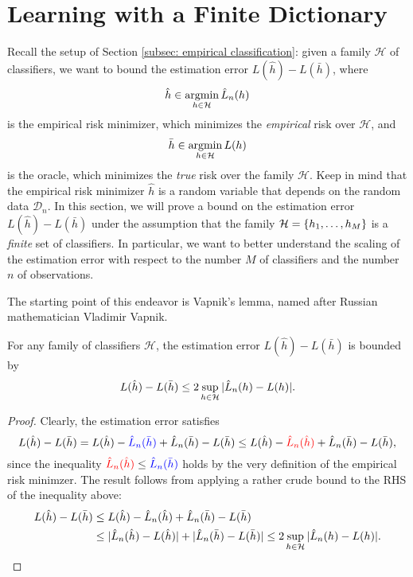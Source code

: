 \section{Learning with a Finite Dictionary}
\label{sec: learning with a finite dictionary}

Recall the setup of Section \ref{subsec: empirical classification}: given a family $\mathcal{H}$ of classifiers, we want to bound the estimation error $L(\hat{h}) - L(\bar{h})$, where
\[
    \hat{h} \in \operatorname*{argmin}_{h \in \mathcal{H}} \hat{L}_n(h)
\]
is the empirical risk minimizer, which minimizes the \emph{empirical} risk over $\mathcal{H}$, and
\[
    \bar{h} \in \operatorname*{argmin}_{h \in \mathcal{H}} L(h)
\]
is the oracle, which minimizes the \emph{true} risk over the family $\mathcal{H}$. Keep in mind that the empirical risk minimizer $\hat{h}$ is a random variable that depends on the random data $\mathcal{D}_n$. In this section, we will prove a bound on the estimation error $L(\hat{h}) - L(\bar{h})$ under the assumption that the family $\mathcal{H} = \set{h_1, \dots, h_M}$ is a \emph{finite} set of classifiers. In particular, we want to better understand the scaling of the estimation error with respect to the number $M$ of classifiers and the number $n$ of observations.

The starting point of this endeavor is Vapnik's lemma, named after Russian mathematician Vladimir Vapnik.

\begin{lemma}
\label{lem: bound on estimation error}
For any family of classifiers $\mathcal{H}$, the estimation error $L(\hat{h}) - L(\bar{h})$ is bounded by
\[
    L(\hat{h}) - L(\bar{h}) \leq 2 \sup_{h \in \mathcal{H}} \abs*{\hat{L}_n(h) - L(h)}.
\]
\end{lemma}

\begin{proof}
Clearly, the estimation error satisfies
\[
    L(\hat{h}) - L(\bar{h}) = L(\hat{h}) - {\color{blue} \hat{L}_n(\bar{h})} + \hat{L}_n(\bar{h}) - L(\bar{h}) \leq L(\hat{h}) - {\color{red} \hat{L}_n(\hat{h})} + \hat{L}_n(\bar{h}) - L(\bar{h}),
\]
since the inequality ${\color{red} \hat{L}_n(\hat{h})} \leq {\color{blue} \hat{L}_n(\bar{h})}$ holds by the very definition of the empirical risk minimzer. The result follows from applying a rather crude bound to the RHS of the inequality above:
\begin{align*}
    L(\hat{h}) - L(\bar{h}) &\leq L(\hat{h}) - \hat{L}_n(\hat{h}) + \hat{L}_n(\bar{h}) - L(\bar{h}) \\
    &\leq \abs*{\hat{L}_n(\hat{h}) - L(\hat{h})} + \abs*{\hat{L}_n(\bar{h}) - L(\bar{h})} \leq 2 \sup_{h \in \mathcal{H}} \abs*{\hat{L}_n(h) - L(h)}. \qedhere
\end{align*}
\end{proof}

